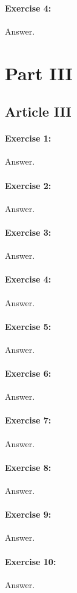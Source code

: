 \documentclass{article}
\begin{document}
\paragraph{Exercise 4:}
Answer.
\newpage

\section*{Part III}

\subsection*{Article III}
\paragraph{Exercise 1:}
Answer.
\paragraph{Exercise 2:}
Answer.
\paragraph{Exercise 3:}
Answer.
\paragraph{Exercise 4:}
Answer.
\paragraph{Exercise 5:}
Answer.
\paragraph{Exercise 6:}
Answer.
\paragraph{Exercise 7:}
Answer.
\paragraph{Exercise 8:}
Answer.
\paragraph{Exercise 9:}
Answer.
\paragraph{Exercise 10:}
Answer.
\end{document}
